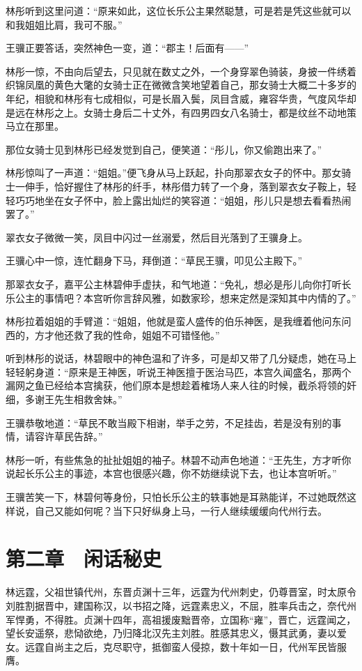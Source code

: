 林彤听到这里问道：“原来如此，这位长乐公主果然聪慧，可是若是凭这些就可以和我姐姐比肩，我可不服。”

王骥正要答话，突然神色一变，道：“郡主！后面有——”

林彤一惊，不由向后望去，只见就在数丈之外，一个身穿翠色骑装，身披一件绣着织锦凤凰的黄色大氅的女骑士正在微微含笑地望着自己，那女骑士大概二十多岁的年纪，相貌和林彤有七成相似，可是长眉入鬓，凤目含威，雍容华贵，气度风华却是远在林彤之上。女骑士身后二十丈外，有四男四女八名骑士，都是纹丝不动地策马立在那里。

那位女骑士见到林彤已经发觉到自己，便笑道：“彤儿，你又偷跑出来了。”

林彤惊叫了一声道：“姐姐。”便飞身从马上跃起，扑向那翠衣女子的怀中。那女骑士一伸手，恰好握住了林彤的纤手，林彤借力转了一个身，落到翠衣女子鞍上，轻轻巧巧地坐在女子怀中，脸上露出灿烂的笑容道：“姐姐，彤儿只是想去看看热闹罢了。”

翠衣女子微微一笑，凤目中闪过一丝溺爱，然后目光落到了王骥身上。

王骥心中一惊，连忙翻身下马，拜倒道：“草民王骥，叩见公主殿下。”

那翠衣女子，嘉平公主林碧伸手虚扶，和气地道：“免礼，想必是彤儿向你打听长乐公主的事情吧？本宫听你言辞风雅，如数家珍，想来定然是深知其中内情的了。”

林彤拉着姐姐的手臂道：“姐姐，他就是蛮人盛传的伯乐神医，是我缠着他问东问西的，方才他还救了我的性命，姐姐不可错怪他。”

听到林彤的说话，林碧眼中的神色温和了许多，可是却又带了几分疑虑，她在马上轻轻躬身道：“原来是王神医，听说王神医擅于医治马匹，本宫久闻盛名，那两个漏网之鱼已经给本宫擒获，他们原本是想趁着榷场人来人往的时候，截杀将领的奸细，多谢王先生相救舍妹。”

王骥恭敬地道：“草民不敢当殿下相谢，举手之劳，不足挂齿，若是没有别的事情，请容许草民告辞。”

林彤一听，有些焦急的扯扯姐姐的袖子。林碧不动声色地道：“王先生，方才听你说起长乐公主的事迹，本宫也很感兴趣，你不妨继续说下去，也让本宫听听。”

王骥苦笑一下，林碧何等身份，只怕长乐公主的轶事她是耳熟能详，不过她既然这样说，自己又能如何呢？当下只好纵身上马，一行人继续缓缓向代州行去。

\chapter{第二章　闲话秘史}

林远霆，父祖世镇代州，东晋贞渊十三年，远霆为代州刺史，仍尊晋室，时太原令刘胜割据晋中，建国称汉，以书招之降，远霆素忠义，不屈，胜率兵击之，奈代州军悍勇，不得胜。贞渊十四年，高祖援废黜晋帝，立国称“雍”，晋亡，远霆闻之，望长安遥祭，悲恸欲绝，乃归降北汉先主刘胜。胜感其忠义，慑其武勇，妻以爱女。远霆自尚主之后，克尽职守，抵御蛮人侵掠，数十年如一日，代州军民皆服膺。


